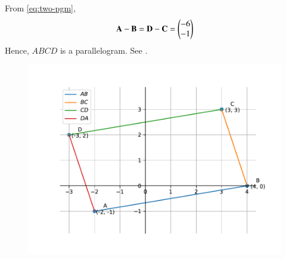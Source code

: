 	  From \eqref{eq:two-pgm},
\begin{align}
\mathbf{A}-\mathbf{B} = 
\mathbf{D}-\mathbf{C} =  \begin{pmatrix}-6\\-1\end{pmatrix}
\end{align}
Hence, $ABCD$ is a parallelogram.
See .
\begin{figure}[H]
  \centering
   \includegraphics[width=0.75\columnwidth]{chapters/11/10/1/9/figs/fig.pdf}
    \caption{}
     \label{fig:chapters/11/10/1/91}  
\end{figure}



